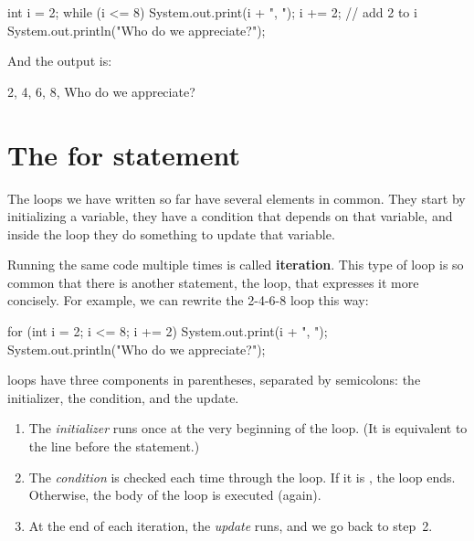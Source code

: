 \begin{code}
int i = 2;
while (i <= 8) {
    System.out.print(i + ", ");
    i += 2;  // add 2 to i
}
System.out.println("Who do we appreciate?");
\end{code}

And the output is:

\begin{stdout}
2, 4, 6, 8, Who do we appreciate?
\end{stdout}


\section{The for statement}


The loops we have written so far have several elements in common.
They start by initializing a variable, they have a condition that depends on that variable, and inside the loop they do something to update that variable.


Running the same code multiple times is called {\bf iteration}.
This type of loop is so common that there is another statement, the  loop, that expresses it more concisely.
For example, we can rewrite the 2-4-6-8 loop this way:

\begin{code}
for (int i = 2; i <= 8; i += 2) {
    System.out.print(i + ", ");
}
System.out.println("Who do we appreciate?");
\end{code}

 loops have three components in parentheses, separated by semicolons: the initializer, the condition, and the update.

\begin{enumerate}

\item The {\em initializer} runs once at the very beginning of the loop.
(It is equivalent to the line before the  statement.)

\item The {\em condition} is checked each time through the loop.
If it is , the loop ends.
Otherwise, the body of the loop is executed (again).

\item At the end of each iteration, the {\em update} runs, and we go back to step~2.

\end{enumerate}

